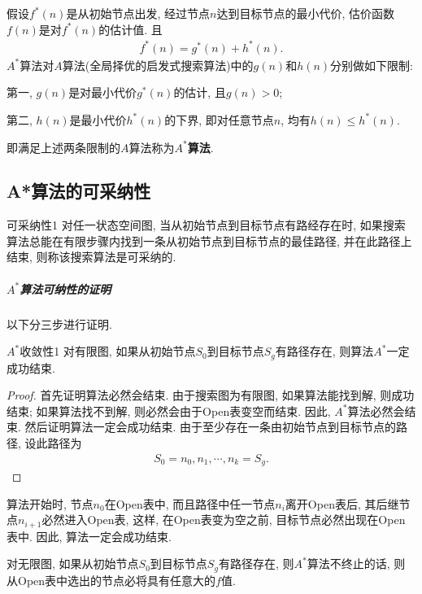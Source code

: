 假设$f^*(n)$是从初始节点出发, 经过节点$n$达到目标节点的最小代价, 估价函数$f(n)$是对$f^*(n)$的估计值. 且
\begin{align}
    f^*(n)=g^*(n)+h^*(n).
\end{align}
$A^*$算法对$A$算法(全局择优的启发式搜索算法)中的$g(n)$和$h(n)$分别做如下限制:

第一, $g(n)$是对最小代价$g^*(n)$的估计, 且$g(n)>0$;

第二, $h(n)$是最小代价$h^*(n)$的下界, 即对任意节点$n$, 均有$h(n)\leq h^*(n)$.

即满足上述两条限制的$A$算法称为\textbf{$A^*$算法}.
\subsection{A*算法的可采纳性}
\begin{mydef}{可采纳性}{1}
    对任一状态空间图, 当从初始节点到目标节点有路经存在时, 如果搜索算法总能在有限步骤内找到一条从初始节点到目标节点的最佳路径, 并在此路径上结束, 则称该搜索算法是可采纳的.
\end{mydef}
\subparagraph{$A^*$算法可纳性的证明}
以下分三步进行证明.
\begin{mythm}{$A^*$收敛性}{1}
    对有限图, 如果从初始节点$S_0$到目标节点$S_g$有路径存在, 则算法$A^*$一定成功结束.
\end{mythm}
\begin{proof}
首先证明算法必然会结束. 由于搜索图为有限图, 如果算法能找到解, 则成功结束; 如果算法找不到解, 则必然会由于Open表变空而结束. 因此, $A^*$算法必然会结束.
然后证明算法一定会成功结束. 由于至少存在一条由初始节点到目标节点的路径, 设此路径为
\begin{align}
    S_0=n_0, n_1, \cdots, n_k=S_g.
\end{align}
\end{proof}
算法开始时, 节点$n_0$在Open表中, 而且路径中任一节点$n_i$离开Open表后, 其后继节点$n_{i+1}$必然进入Open表, 这样, 在Open表变为空之前, 目标节点必然出现在Open表中. 因此, 算法一定会成功结束.
\begin{mylem}{}{}\label{AIlem001}
    对无限图, 如果从初始节点$S_0$到目标节点$S_g$有路径存在, 则$A^*$算法不终止的话, 则从Open表中选出的节点必将具有任意大的$f$值.
\end{mylem}

